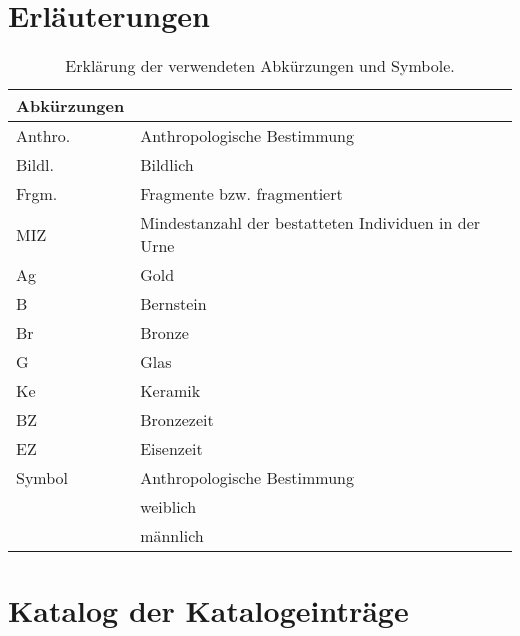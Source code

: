 
\chapter{Erläuterungen}
\lipsum[55]
\bigskip


\begin{table}[h]
	\centering
\begin{tabular}[]{ll}
	Abkürzungen &  \\
	\midrule Anthro. & Anthropologische Bestimmung \\
	Bildl. & Bildlich \\
	Frgm. & Fragmente bzw. fragmentiert \\
	MIZ & Mindestanzahl der bestatteten Individuen in der Urne \\
	Ag & Gold \\
	B & Bernstein \\
	Br & Bronze \\
	G & Glas \\
	Ke & Keramik \\
	BZ & Bronzezeit\\
	EZ & Eisenzeit\\
	\midrule Symbol & Anthropologische Bestimmung \\
	\midrule \Female & weiblich \\
	\Male & männlich \\
	\bottomrule 
\end{tabular}
\caption{Erklärung der verwendeten Abkürzungen und Symbole.}
\end{table}




\chapter{Katalog der Katalogeinträge}

